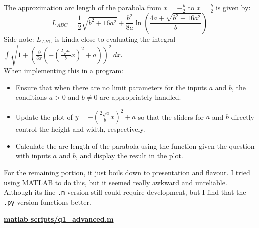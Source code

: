 \documentclass[a4paper, 12pt]{report}
\def\link{blue!50!black}
\begin{document}
    The approximation arc length of the parabola from $x = -\frac{b}{2}$ to $x = \frac{b}{2}$ is given by:
    \[L_{ABC} = \frac{1}{2}\sqrt{b^2 + 16a^2} + \frac{b^2}{8a}\ln\left(\frac{4a + \sqrt{b^2 + 16a^2}}{b}\right)\]
    Side note: $L_{ABC}$ is kinda close to evaluating the integral $\int \sqrt{1 + \left(\frac{\partial}{\partial x}\left(-\left(\frac{2\sqrt{a}}{b}x\right)^2 + a\right)\right)^2} \, dx$.\\ When implementing this in a program:
    \begin{itemize}[itemsep=-0.1cm]
        \item Ensure that when there are no limit parameters for the inputs \(a\) and \(b\), the conditions \(a > 0\) and \(b \neq 0\) are appropriately handled.
        \item Update the plot of \(y = -\left(\frac{2\sqrt{a}}{b}x\right)^2 + a\) so that the sliders for \(a\) and \(b\) directly control the height and width, respectively.
        \item Calculate the arc length of the parabola using the function given the question with inputs \(a\) and \(b\), and display the result in the plot.
    \end{itemize}
    \raggedright
    
    For the remaining portion, it just boils down to presentation and flavour. I tried using MATLAB to do this, but it seemed really awkward and unreliable. Although its fine \texttt{.m} version still could require development, but I find that the \texttt{.py} version functions better.

    \newpage
    
    \centering
    
    \href{https://github.com/sakx7/mathcompuni/blob/main/matlab scripts/q1_advanced.m}{\textcolor{\link}{\textbf{matlab scripts/q1\_advanced.m}}}
   
\end{document}

